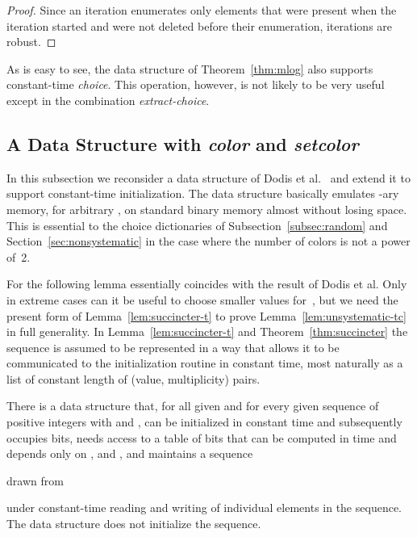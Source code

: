 \documentclass[envcountsame,envcountsect,undated,nolinenumbers]{lnthi}
\def\Tvn#1{\hbox{\textit{#1\/}}}
\begin{document}
\begin{proof}
Since an iteration enumerates only elements that
were present when the iteration started and were
not deleted before their enumeration, iterations
are
robust.
\end{proof}

As is easy to see, the data structure of
Theorem~\ref{thm:mlog} also supports constant-time \Tvn{choice}.
This operation,
however, is not likely to
be very useful except in the combination \Tvn{extract-choice}.

\subsection{A Data Structure with \Tvn{color} and \Tvn{setcolor}}

In this subsection we reconsider a data structure
of Dodis et al.~\cite{DodPT10} and extend it to support
constant-time initialization.
The data structure basically emulates
-ary memory, for arbitrary ,
on standard binary memory almost without
losing space.
This is essential
to the choice dictionaries
of Subsection~\ref{subsec:random}
and Section~\ref{sec:nonsystematic} in the case
where the number of colors is not a power of~2.

For  the following lemma
essentially coincides with the result
of Dodis et al.
Only in extreme cases can it be useful
to choose smaller values for~, but we need the
present form of Lemma~\ref{lem:succincter-t}
to prove Lemma~\ref{lem:unsystematic-tc}
in full generality.
In Lemma~\ref{lem:succincter-t} and Theorem~\ref{thm:succincter}
the sequence  is assumed to be represented
in a way that allows it to be communicated to the
initialization routine in constant time,
most naturally as a list of constant length
of (value, multiplicity) pairs.

\begin{lemma}
\label{lem:succincter-t}There is a data structure
that, for all given 
and for every given sequence
 of  positive integers
with  and
,
can be initialized in constant time and subsequently
occupies  bits,
needs access to a table of  bits
that can be computed in  time and
depends only on , 
and ,
and maintains a sequence
 
drawn from

under constant-time reading and writing
of individual elements in the sequence.
The data structure does not initialize the sequence.
\end{lemma}
\end{document}
